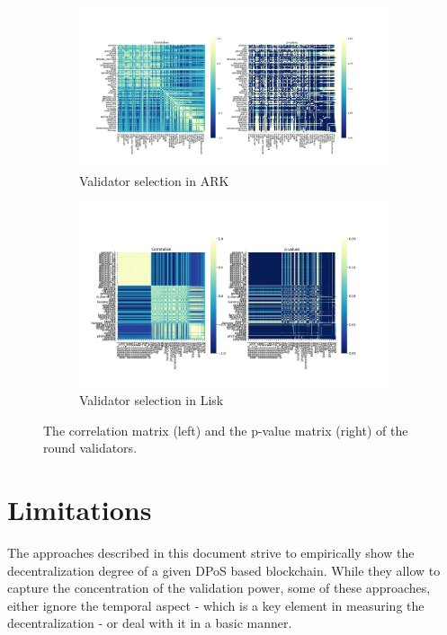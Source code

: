 \documentclass{article}
\begin{document}
\begin{figure}
     \centering
     \begin{subfigure}[b]{\textwidth}
         \centering
         \includegraphics[width=\textwidth]{figures/ARKWeekReal.png}
         \caption{Validator selection in ARK}
         \label{fig:CORRARK}
     \end{subfigure}
     \hfill
     \begin{subfigure}[b]{\textwidth}
         \centering
         \includegraphics[width=\textwidth]{figures/LISKWeekReal.png}
         \caption{Validator selection in Lisk}
         \label{fig:CORRLISK}
     \end{subfigure}
        \caption{The correlation matrix (left) and the p-value matrix (right) of the round validators.}
        \label{fig:three graphs}
\end{figure}


\section{Limitations}
The approaches described in this document strive to empirically show the decentralization degree of a given DPoS based blockchain. While they allow to capture the concentration of the validation power, some of these approaches, either ignore the temporal aspect - which is a key element in measuring the decentralization - or deal with it in a basic manner.  
\end{document}
